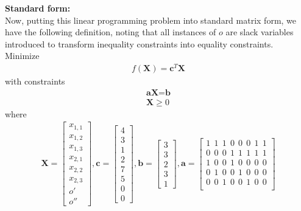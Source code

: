 \documentclass[11pt]{article}
\begin{document}
\begin{sol}
\textbf{Standard form:} \\
Now, putting this linear programming problem into standard matrix form, we have the following definition, noting that all instances of $o$ are slack variables introduced to transform inequality constraints into equality constraints. \\

Minimize 
\begin{eqnarray*}
f(\textbf{X}) = \textbf{c}^{T}\textbf{X}
\end{eqnarray*}
with constraints 
\begin{eqnarray*}
\textbf{aX} = \textbf{b} \\
\textbf{X} \geq 0
\end{eqnarray*}
where
\begin{eqnarray*}
\textbf{X} = \begin{bmatrix}x_{1,1} \\x_{1,2}\\x_{1,3} \\ x_{2,1} \\ x_{2,2} \\x_{2,3} \\ o' \\ o'' \end{bmatrix}, 
\textbf{c} = \begin{bmatrix}4 \\3\\ 1 \\ 2 \\ 7 \\ 5 \\0 \\ 0 \end{bmatrix}, 
\textbf{b} = \begin{bmatrix}3 \\3\\2\\3\\1 \end{bmatrix}, 
\textbf{a} = 
\begin{bmatrix} 
1 \ \ 1 \ \ 1 \ \ 0 \ \ 0 \ \ 0 \ \ 1 \ \ 1 \\
0 \ \ 0 \ \ 0 \ \ 1 \ \ 1 \ \ 1 \ \ 1 \ \ 1 \\
1 \ \ 0 \ \ 0 \ \ 1 \ \ 0 \ \ 0 \ \ 0 \ \ 0 \\
0 \ \ 1 \ \ 0 \ \ 0 \ \ 1 \ \ 0 \ \ 0 \ \ 0 \\
0 \ \ 0 \ \ 1 \ \ 0 \ \ 0 \ \ 1 \ \ 0 \ \ 0 \\
\end{bmatrix}\\
\end{eqnarray*}

\end{sol}
\end{document}
